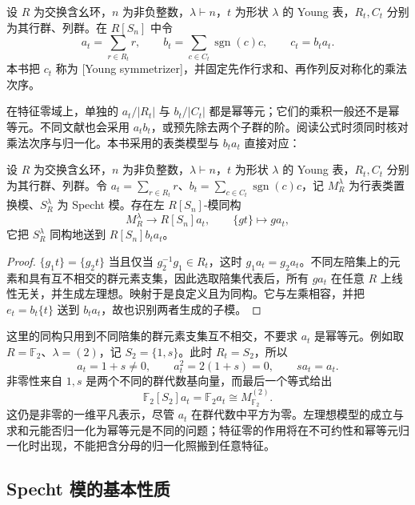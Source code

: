 \begin{definition}\label{b5:def:young-symmetrizer}
	设 \(R\) 为交换含幺环，\(n\) 为非负整数，\(\lambda\vdash n\)，\(t\) 为形状 \(\lambda\) 的 Young 表，\(R_t,C_t\) 分别为其行群、列群。在 \(R[S_n]\) 中令
	\[
		a_t=\sum_{r\in R_t}r,\qquad b_t=\sum_{c\in C_t}\operatorname{sgn}(c)c,\qquad c_t=b_ta_t.
	\]
	本书把 \(c_t\) 称为 [Young symmetrizer]，并固定先作行求和、再作列反对称化的乘法次序。
\end{definition}

在特征零域上，单独的 \(a_t/|R_t|\) 与 \(b_t/|C_t|\) 都是幂等元；它们的乘积一般还不是幂等元。不同文献也会采用 \(a_tb_t\)，或预先除去两个子群的阶。阅读公式时须同时核对乘法次序与归一化。本书采用的表类模型与 \(b_ta_t\) 直接对应：

\begin{proposition}\label{b5:prop:young-ideal-model}
	设 \(R\) 为交换含幺环，\(n\) 为非负整数，\(\lambda\vdash n\)，\(t\) 为形状 \(\lambda\) 的 Young 表，\(R_t,C_t\) 分别为其行群、列群。令 \(a_t=\sum_{r\in R_t}r\)、\(b_t=\sum_{c\in C_t}\operatorname{sgn}(c)c\)，记 \(M_R^\lambda\) 为行表类置换模、\(S_R^\lambda\) 为 Specht 模。存在左 \(R[S_n]\)-模同构
	\[
		M_R^\lambda\longrightarrow R[S_n]a_t,\qquad \{gt\}\longmapsto ga_t,
	\]
	它把 \(S_R^\lambda\) 同构地送到 \(R[S_n]b_ta_t\)。
\end{proposition}
\begin{proof}
	\(\{g_1t\}=\{g_2t\}\) 当且仅当 \(g_2^{-1}g_1\in R_t\)，这时 \(g_1a_t=g_2a_t\)。不同左陪集上的元素和具有互不相交的群元素支集，因此选取陪集代表后，所有 \(ga_t\) 在任意 \(R\) 上线性无关，并生成左理想。映射于是良定义且为同构。它与左乘相容，并把 \(e_t=b_t\{t\}\) 送到 \(b_ta_t\)，故也识别两者生成的子模。
\end{proof}

这里的同构只用到不同陪集的群元素支集互不相交，不要求 \(a_t\) 是幂等元。例如取 \(R=\mathbb F_2\)、\(\lambda=(2)\)，记 \(S_2=\{1,s\}\)。此时 \(R_t=S_2\)，所以
\[
	a_t=1+s\ne0,\qquad a_t^2=2(1+s)=0,\qquad sa_t=a_t.
\]
非零性来自 \(1,s\) 是两个不同的群代数基向量，而最后一个等式给出
\[
	\mathbb F_2[S_2]a_t=\mathbb F_2a_t\cong M_{\mathbb F_2}^{(2)}.
\]
这仍是非零的一维平凡表示，尽管 \(a_t\) 在群代数中平方为零。左理想模型的成立与求和元能否归一化为幂等元是不同的问题；特征零的作用将在不可约性和幂等元归一化时出现，不能把含分母的归一化照搬到任意特征。

\subsection{Specht 模的基本性质}
\label{b5:subsec:0602:03}

